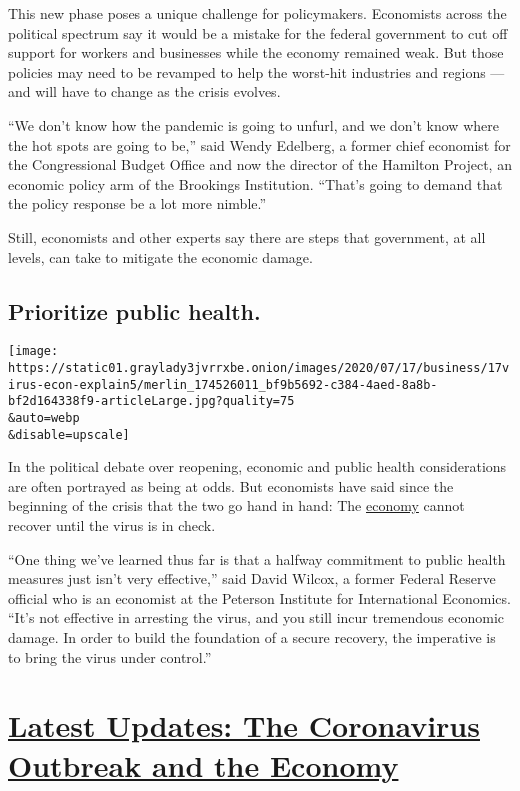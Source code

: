This new phase poses a unique challenge for policymakers. Economists
across the political spectrum say it would be a mistake for the federal
government to cut off support for workers and businesses while the
economy remained weak. But those policies may need to be revamped to
help the worst-hit industries and regions --- and will have to change as
the crisis evolves.

``We don't know how the pandemic is going to unfurl, and we don't know
where the hot spots are going to be,'' said Wendy Edelberg, a former
chief economist for the Congressional Budget Office and now the director
of the Hamilton Project, an economic policy arm of the Brookings
Institution. ``That's going to demand that the policy response be a lot
more nimble.''

Still, economists and other experts say there are steps that government,
at all levels, can take to mitigate the economic damage.

\hypertarget{prioritize-public-health}{%
\subsection{Prioritize public health.}\label{prioritize-public-health}}

\texttt{[image: https://static01.graylady3jvrrxbe.onion/images/2020/07/17/business/17virus-econ-explain5/merlin\_174526011\_bf9b5692-c384-4aed-8a8b-bf2d164338f9-articleLarge.jpg?quality=75\\\&auto=webp\\\&disable=upscale]}

In the political debate over reopening, economic and public health
considerations are often portrayed as being at odds. But economists have
said since the beginning of the crisis that the two go hand in hand: The
\href{https://www.nytimes3xbfgragh.onion/2020/07/07/business/sweden-economy-coronavirus.html}{economy}
cannot recover until the virus is in check.

``One thing we've learned thus far is that a halfway commitment to
public health measures just isn't very effective,'' said David Wilcox, a
former Federal Reserve official who is an economist at the Peterson
Institute for International Economics. ``It's not effective in arresting
the virus, and you still incur tremendous economic damage. In order to
build the foundation of a secure recovery, the imperative is to bring
the virus under control.''

\hypertarget{latest-updates-the-coronavirus-outbreak-and-the-economy}{%
\section{\texorpdfstring{\href{https://www.nytimes3xbfgragh.onion/live/2020/08/21/business/stock-market-today-coronavirus?action=click\&pgtype=Article\&state=default\&region=MAIN_CONTENT_1\&context=storylines_live_updates}{Latest
Updates: The Coronavirus Outbreak and the
Economy}}{Latest Updates: The Coronavirus Outbreak and the Economy}}\label{latest-updates-the-coronavirus-outbreak-and-the-economy}}

